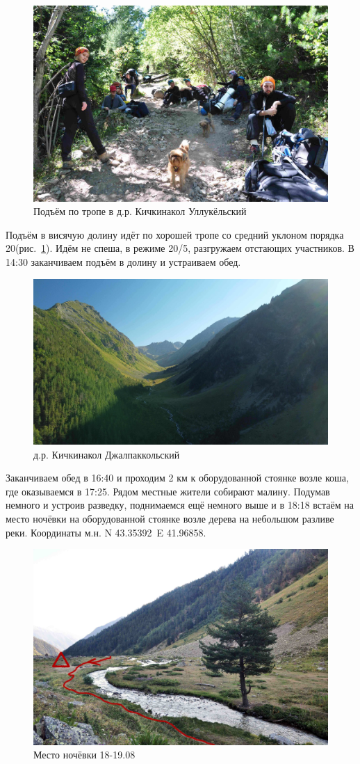 \begin{figure}[h!]
	\centering
	\includegraphics[width=0.7\linewidth]{../pics/DSC_0436}
	\caption{Подъём по тропе в д.р. Кичкинакол Уллукёльский}
	\label{fig:DSC_0436}
\end{figure}

Подъём в висячую долину идёт по хорошей тропе со средний уклоном порядка 20\degree (рис.~\ref{fig:DSC_0436}). Идём не спеша, в режиме 20/5, разгружаем отстающих участников. В 14:30 заканчиваем подъём в долину и устраиваем обед.

\begin{figure}[h!]
	\centering
	\includegraphics[width=0.7\linewidth]{../pics/DJI_0805}
	\caption{д.р. Кичкинакол Джалпаккольский}
	\label{fig:kichkinakol}
\end{figure}

Заканчиваем обед в 16:40 и проходим 2 км к оборудованной стоянке возле коша, где оказываемся в 17:25. Рядом местные жители собирают малину. Подумав немного и устроив разведку, поднимаемся ещё немного выше и в 18:18 встаём на место ночёвки на оборудованной стоянке возле дерева на небольшом разливе реки. Координаты м.н. N 43.35392\degree~E 41.96858\degree.
\begin{figure}[h!]
	\centering
	\includegraphics[width=0.7\linewidth]{../pics/camp_18}
	\caption{Место ночёвки 18-19.08}
	\label{fig:camp_18}
\end{figure}


\newpage
